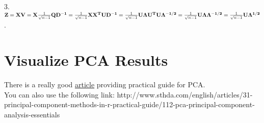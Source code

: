 \documentclass[11pt]{article}
\begin{document}
\hspace{-0.68cm} 3. ${\bf Z} = {\bf XV} = {\bf X}\frac{1}{\sqrt{n-1}}{\bf QD^{-1}} = \frac{1}{\sqrt{n-1}}{\bf XX^TUD^{-1}} = \frac{1}{\sqrt{n-1}}{\bf U{\Lambda}U^TU{\Lambda}^{-1/2}} = \frac{1}{\sqrt{n-1}}{\bf U{\Lambda}{\Lambda}^{-1/2}} = \frac{1}{\sqrt{n-1}}{\bf U{\Lambda}^{1/2}}$.

\section{Visualize PCA Results}
There is a really good \href{http://www.sthda.com/english/articles/31-principal-component-methods-in-r-practical-guide/112-pca-principal-component-analysis-essentials}{article} providing practical guide for PCA. \\

\hspace{-0.68cm} You can also use the following link: http://www.sthda.com/english/articles/31-principal-component-methods-in-r-practical-guide/112-pca-principal-component-analysis-essentials
\end{document}
